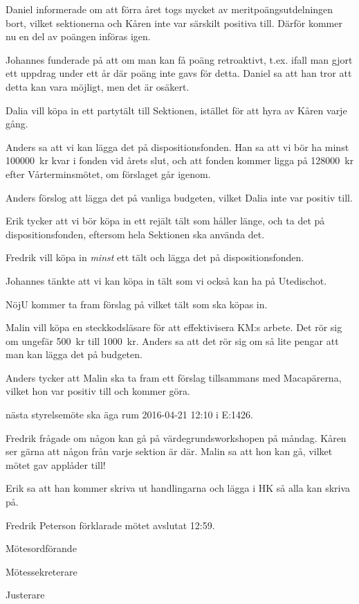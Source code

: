 \documentclass[10pt]{article}
\def\mo{Fredrik Peterson}
\def\ms{Erik Månsson}
\def\ji{Malin Lindström}
\begin{document}
\begin{paragrafer}
Daniel informerade om att förra året togs mycket av meritpoängsutdelningen bort, vilket sektionerna och Kåren inte var särskilt positiva till. Därför kommer nu en del av poängen införas igen.

Johannes funderade på att om man kan få poäng retroaktivt, t.ex. ifall man gjort ett uppdrag under ett år där poäng inte gavs för detta. Daniel sa att han tror att detta kan vara möjligt, men det är osäkert.

Dalia vill köpa in ett partytält till Sektionen, istället för att hyra av Kåren varje gång.

Anders sa att vi kan lägga det på dispositionsfonden. Han sa att vi bör ha minst \SI{100000}{kr} kvar i fonden vid årets slut, och att fonden kommer ligga på \SI{128000}{kr} efter Vårterminsmötet, om förslaget går igenom.

Anders förslog att lägga det på vanliga budgeten, vilket Dalia inte var positiv till.

Erik tycker att vi bör köpa in ett rejält tält som håller länge, och ta det på dispositionsfonden, eftersom hela Sektionen ska använda det.

Fredrik vill köpa in \emph{minst} ett tält och lägga det på dispositionsfonden.

Johannes tänkte att vi kan köpa in tält som vi också kan ha på Utedischot.

NöjU kommer ta fram förslag på vilket tält som ska köpas in.

Malin vill köpa en steckkodsläsare för att effektivisera KM:s arbete. Det rör sig om ungefär \SI{500}{kr} till \SI{1000}{kr}. Anders sa att det rör sig om så lite pengar att man kan lägga det på budgeten.

Anders tycker att Malin ska ta fram ett förslag tillsammans med Macapärerna, vilket hon var positiv till och kommer göra.

\Mba nästa styrelsemöte ska äga rum 2016-04-21 12:10 i E:1426.

\Ibfu

Fredrik frågade om någon kan gå på värdegrundsworkshopen på måndag. Kåren ser gärna att någon från varje sektion är där. Malin sa att hon kan gå, vilket mötet gav applåder till!

Erik sa att han kommer skriva ut handlingarna och lägga i HK så alla kan skriva på.

{\mo} förklarade mötet avslutat 12:59.

\end{paragrafer}

\hidesignfoot
\begin{signatures}{3}
\signature{\mo}{Mötesordförande}
\signature{\ms}{Mötessekreterare}
\signature{\ji}{Justerare}
\end{signatures}
\end{document}
